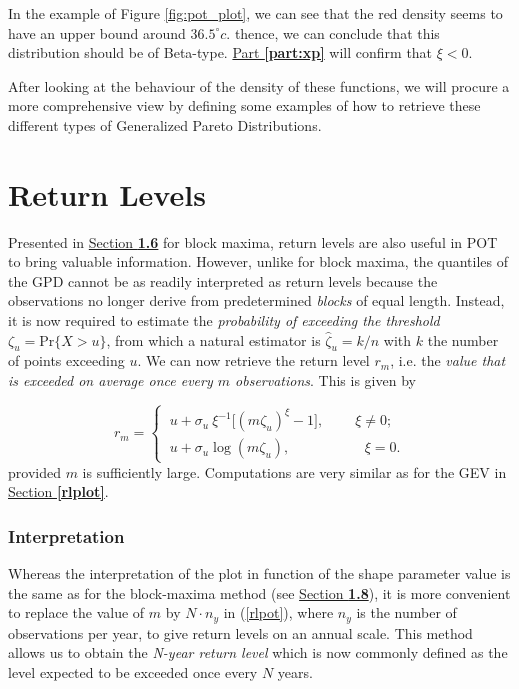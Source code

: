 In the example of Figure \ref{fig:pot_plot}, we can see that the red density seems to have an upper bound around $36.5^{\circ}c$. thence, we can conclude that this distribution should be of Beta-type. \hyperref[part:xp]{Part \textbf{\ref{part:xp}}} will confirm that $\xi<0$.

After looking at the behaviour of the density of these functions, we will procure a more comprehensive view by defining some examples of how to retrieve these different types of Generalized Pareto Distributions.


\section{Return Levels}\label{sec:rl_gpd}

Presented in \hyperref[rlgev]{Section \textbf{1.6}} for block maxima, return levels are also useful in POT to bring valuable information. 
However, unlike for block maxima, the quantiles of the GPD cannot be as readily interpreted as return levels because the observations no longer derive from predetermined \emph{blocks} of equal length. Instead, it is now required to estimate the \emph{probability of exceeding the threshold} $\zeta_u=\text{Pr}\big\{X>u\big\}$, from which a natural estimator is $\hat{\zeta}_u=k/n$ with $k$ the number of points exceeding $u$.
We can now retrieve the return level $r_m$, i.e. the\emph{ value that is exceeded on average once every $m$ observations}. 
This is given by 

\begin{equation}\label{rlpot}
r_m=\begin{cases}
\ u+\sigma_u\ \xi^{-1}\Big[(m\zeta_u)^{\xi}-1\Big], \ \ \ \ \ \ \ \ \  \ \xi\neq 0;\\
\ u +\sigma_u \log(m\zeta_u), \ \quad \ \ \ \ \ \ \  \ \ \ \ \ \ \quad \ \xi =0.
\end{cases}
\end{equation}
provided $m$ is sufficiently large.
Computations are very similar as for the GEV in \hyperref[rlplot]{Section \textbf{\ref{rlplot}}}. 

\subsubsection*{Interpretation}

Whereas the interpretation of the plot in function of the shape parameter value is the same as for the block-maxima method (see \hyperref[rlplot]{Section \textbf{1.8}}), it is more convenient to replace the value of $m$ by $N\cdot n_y$ in (\ref{rlpot}), where $n_y$ is the number of observations per year, to give return levels on an annual scale. This method allows us to obtain the\emph{ N-year return level} which is now commonly defined as the level expected to be exceeded once every $N$ years.

